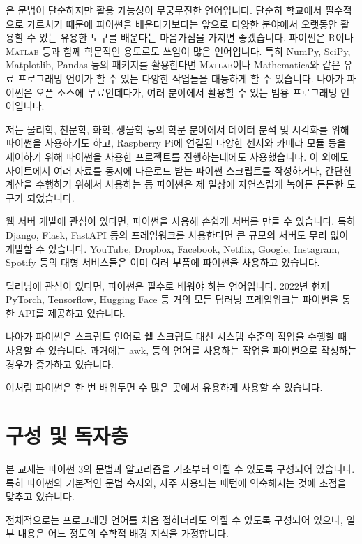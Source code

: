 \documentclass[../main.tex]{subfiles}
\begin{document}
은 문법이 단순하지만 활용 가능성이 무궁무진한 언어입니다.
단순히 학교에서 필수적으로 가르치기 때문에 파이썬을 배운다기보다는 앞으로 다양한 분야에서 오랫동안 활용할 수 있는 유용한 도구를 배운다는 마음가짐을 가지면 좋겠습니다.
파이썬은 R이나 \textsc{Matlab} 등과 함께 학문적인 용도로도 쓰임이 많은 언어입니다.
특히 NumPy, SciPy, Matplotlib, Pandas 등의 패키지를 활용한다면 \textsc{Matlab}이나 Mathematica와 같은 유료 프로그래밍 언어가 할 수 있는 다양한 작업들을 대등하게 할 수 있습니다.
나아가 파이썬은 오픈 소스에 무료인데다가, 여러 분야에서 활용할 수 있는 범용 프로그래밍 언어입니다.

저는 물리학, 천문학, 화학, 생물학 등의 학문 분야에서 데이터 분석 및 시각화를 위해 파이썬을 사용하기도 하고, Raspberry Pi에 연결된 다양한 센서와 카메라 모듈 등을 제어하기 위해 파이썬을 사용한 프로젝트를 진행하는데에도 사용했습니다.
이 외에도 사이트에서 여러 자료를 동시에 다운로드 받는 파이썬 스크립트를 작성하거나, 간단한 계산을 수행하기 위해서 사용하는 등 파이썬은 제 일상에 자연스럽게 녹아든 든든한 도구가 되었습니다.

웹 서버 개발에 관심이 있다면, 파이썬을 사용해 손쉽게 서버를 만들 수 있습니다.
특히 Django, Flask, FastAPI 등의 프레임워크를 사용한다면 큰 규모의 서버도 무리 없이 개발할 수 있습니다.
YouTube, Dropbox, Facebook, Netflix, Google, Instagram, Spotify 등의 대형 서비스들은 이미 여러 부품에 파이썬을 사용하고 있습니다.

딥러닝에 관심이 있다면, 파이썬은 필수로 배워야 하는 언어입니다.
2022년 현재 PyTorch, Tensorflow, Hugging Face 등 거의 모든 딥러닝 프레임워크는 파이썬을 통한 API를 제공하고 있습니다.

나아가 파이썬은 스크립트 언어로 쉘 스크립트 대신 시스템 수준의 작업을 수행할 때 사용할 수 있습니다.
과거에는 awk,  등의 언어를 사용하는 작업을 파이썬으로 작성하는 경우가 증가하고 있습니다.

이처럼 파이썬은 한 번 배워두면 수 많은 곳에서 유용하게 사용할 수 있습니다.

\section{구성 및 독자층}
본 교재는 파이썬 3의 문법과 알고리즘을 기초부터 익힐 수 있도록 구성되어 있습니다.
특히 파이썬의 기본적인 문법 숙지와, 자주 사용되는 패턴에 익숙해지는 것에 초점을 맞추고 있습니다.

전체적으로는 프로그래밍 언어를 처음 접하더라도 익힐 수 있도록 구성되어 있으나, 일부 내용은 어느 정도의 수학적 배경 지식을 가정합니다.
\end{document}
